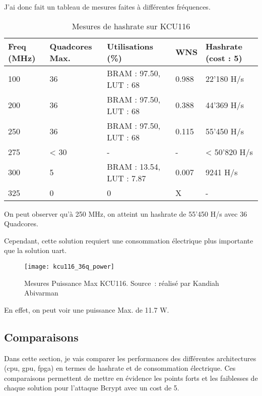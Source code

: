 J'ai donc fait un tableau de mesures faites à différentes fréquences.

\begin{table}[tbph!]
    \centering
    \begin{tabular}{|l|l|l|l|l|}
    \hline
        \textbf{Freq (MHz)} & \textbf{Quadcores Max.} & \textbf{Utilisations (\%)} & \textbf{WNS} & \textbf{Hashrate (cost : 5)} \\ \hline
        100 & 36 & BRAM : 97.50, LUT : 68 & 0.988 & 22'180 H/s \\ \hline
        200 & 36 & BRAM : 97.50, LUT : 68 & 0.388 & 44'369 H/s \\ \hline
        250 & 36 & BRAM : 97.50, LUT : 68 & 0.115 & 55'450 H/s \\ \hline
        275 & < 30 & - & - & < 50'820 H/s \\ \hline
        300 & 5 & BRAM : 13.54, LUT : 7.87 & 0.007 & 9241 H/s \\ \hline
        325 & 0 & 0 & X & - \\ \hline
    \end{tabular}
	\caption{Mesures de hashrate sur KCU116}
	\label{tab:hashrate_measures}
\end{table}

On peut observer qu'à 250 MHz, on atteint un hashrate de 55'450 H/s avec 36 Quadcores.

Cependant, cette solution requiert une consommation électrique plus importante que la solution \gls{uart}. 

\begin{figure}[tbph!]
	\centering
	\texttt{[image: kcu116\_36q\_power]}
	\caption[Mesures Puissance Max KCU116]{Mesures Puissance Max KCU116. Source : réalisé par Kandiah Abivarman}
	\label{fig:kcu116_36q_power}
\end{figure}

En effet, on peut voir une puissance Max. de 11.7 W.


\subsection{Comparaisons}

Dans cette section, je vais comparer les performances des différentes architectures (\gls{cpu}, \gls{gpu}, \gls{fpga}) en termes de hashrate et de consommation électrique. 
Ces comparaisons permettent de mettre en évidence les points forts et les faiblesses de chaque solution pour l'attaque Bcrypt avec un cost de 5.

